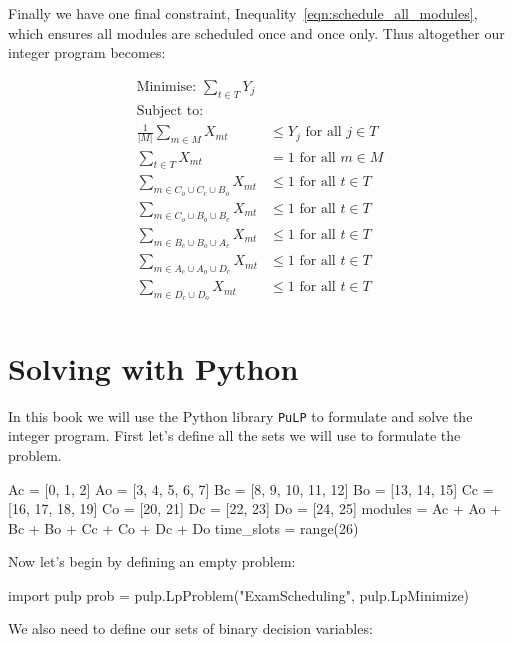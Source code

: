 Finally we have one final constraint, Inequality~\ref{eqn:schedule_all_modules},
which ensures all modules are scheduled once and once only.
Thus altogether our integer program becomes:

\begin{align}
\text{Minimise: } \sum_{t \in T} Y_j & \\
\text{Subject to: } & \nonumber \\
\frac{1}{|M|} \sum_{m \in M} X_{mt} &\leq Y_j \text{ for all } j \in T\\\label{eqn:auxiliary}
\sum_{t \in T} X_{mt} &= 1 \text{ for all } m \in M\\\label{eqn:schedule_all_modules}
\sum_{m \in C_o \cup C_c \cup B_o} X_{mt} &\leq 1 \text{ for all } t \in T\\\label{eqn:clique1}
\sum_{m \in C_o \cup B_o \cup B_c} X_{mt} &\leq 1 \text{ for all } t \in T\\\label{eqn:clique2}
\sum_{m \in B_c \cup B_o \cup A_c} X_{mt} &\leq 1 \text{ for all } t \in T\\\label{eqn:clique3}
\sum_{m \in A_c \cup A_o \cup D_c} X_{mt} &\leq 1 \text{ for all } t \in T\\\label{eqn:clique4}
\sum_{m \in D_c \cup D_o} X_{mt} & \leq 1 \text{ for all } t \in T\\\label{eqn:clique5}
\end{align}


\section{Solving with Python}\label{sec:solving-with-python}
In this book we will use the Python library \texttt{PuLP} to
formulate and solve the integer program. First let's define all the sets we
will use to formulate the problem.

\begin{pyin}
Ac = [0, 1, 2]
Ao = [3, 4, 5, 6, 7]
Bc = [8, 9, 10, 11, 12]
Bo = [13, 14, 15]
Cc = [16, 17, 18, 19]
Co = [20, 21]
Dc = [22, 23]
Do = [24, 25]
modules = Ac + Ao + Bc + Bo + Cc + Co + Dc + Do
time_slots = range(26)
\end{pyin}

Now let's begin by defining an empty problem:

\begin{pyin}
import pulp
prob = pulp.LpProblem("ExamScheduling", pulp.LpMinimize)
\end{pyin}

We also need to define our sets of binary decision variables:

